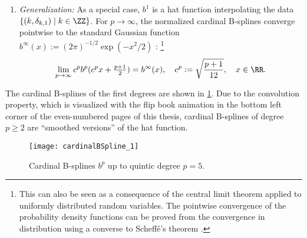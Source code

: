 \begin{enumerate}
  \item
  \emph{Generalization:}
  As a special case, $b^1$ is a hat function interpolating the data
  $\{(k, \delta_{k,1}) \mid k \in \ZZ\}$.
  For $p \to \infty$, the normalized cardinal B-splines converge
  pointwise to the standard Gaussian function
  $b^\infty(x) := (2\pi)^{-1/2} \exp(-x^2/2)$ \cite{Unser92Asymptotic}:%
  \footnote{%
    This can also be seen as a consequence of the central limit theorem
    applied to uniformly distributed random variables.
    The pointwise convergence of the probability density functions
    can be proved from the convergence
    in distribution using a converse to Scheffé's theorem
    \cite{Boos85Converse}.%
  }
  \begin{equation}
    \lim_{p \to \infty}
    c^p b^p(c^p x + \tfrac{p+1}{2})
    = b^\infty(x),\quad
    c^p := \sqrt{\frac{p+1}{12}},\quad
    x \in \RR.
  \end{equation}
\end{enumerate}
The cardinal B-splines of the first degrees are shown in
\cref{fig:cardinalBSpline}.
Due to the convolution property,
which is visualized with the flip book animation in the bottom left corner
of the even-numbered pages of this thesis,
cardinal B-splines of degree $p \ge 2$ are ``smoothed versions''
of the hat function.

\begin{figure}
  \texttt{[image: cardinalBSpline\_1]}%
  \caption{Cardinal B-splines $b^p$ up to quintic degree $p = 5$.}%
  \label{fig:cardinalBSpline}
\end{figure}


